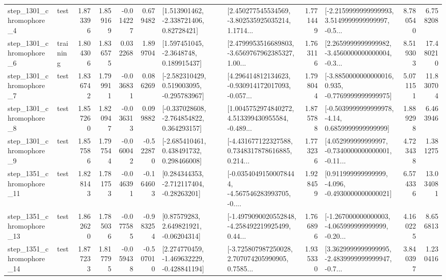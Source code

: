 \begin{tabular}{llrrrrllrlrr}
  step\_1301\_chromophore\_4 &      test &      1.873396 &    1.859169 &     -0.014227 &  0.679482 &     [1.513901462, -2.338721406, 0.82728421] &  [2.450277545534569, -3.802535925035214, 1.1714... &       1.771449 &  [-2.2159999999999993, 3.5149999999999997, -0.5... &            8.780540 &          6.758208 \\
  step\_1301\_chromophore\_6 &  training &      1.804306 &    1.836575 &      0.032268 &  1.899704 &      [1.597451045, -2.3648748, 0.189915437] &  [2.4799953516689803, -3.6569767962385327, 1.00... &       1.763116 &  [2.2659999999999982, -3.4560000000000004, -0.3... &            8.519303 &         17.480210 \\
  step\_1301\_chromophore\_7 &      test &      1.836742 &    1.799911 &     -0.036831 &  0.086269 &   [-2.582310429, 0.519003095, -0.295783967] &  [4.296414812134623, -0.930914172017093, -0.057... &       1.798044 &  [-3.8850000000000016, 0.935, -0.7769999999999975] &            5.071151 &         11.830704 \\
  step\_1301\_chromophore\_8 &      test &      1.857260 &    1.820947 &     -0.036313 &  0.099882 &   [-0.337028608, -2.764854822, 0.364293157] &  [1.0045752974840272, 4.513399430955584, -0.489... &       1.875788 &   [-0.5039999999999978, -4.14, 0.6859999999999999] &            1.889298 &          6.463946 \\
  step\_1301\_chromophore\_9 &      test &      1.857586 &    1.797544 &     -0.060042 & -0.522870 &    [-2.685410461, 0.438491732, 0.298466008] &  [-4.431677122327588, 0.7348317878616885, 0.214... &       1.773236 &  [4.052999999999997, -0.7340000000000001, -0.11... &            4.723438 &          1.381275 \\
 step\_1351\_chromophore\_11 &      test &      1.828143 &    1.781753 &     -0.046391 & -0.164603 &    [0.284344353, -2.712117404, -0.28263201] &  [-0.03540491500078444, -4.567546283993705, -0.... &       1.928459 &   [0.911999999999999, -4.096, -0.4930000000000021] &            6.574336 &         13.034081 \\
 step\_1351\_chromophore\_13 &      test &      1.862620 &    1.785036 &     -0.077585 & -0.983254 &      [0.87579283, 2.649821921, -0.06204314] &  [-1.4979090020552848, -4.258492219925499, 0.44... &       1.766896 &  [-1.267000000000003, -4.065999999999999, -0.20... &            4.160225 &          8.656813 \\
 step\_1351\_chromophore\_14 &      test &      1.877233 &    1.817795 &     -0.059438 & -0.507010 &   [2.274770459, -1.469632229, -0.428841194] &  [-3.725807987250028, 2.707074205990905, 0.7585... &       1.935330 &  [3.3629999999999995, -2.4839999999999947, -0.7... &            3.840397 &          1.230416 \\

\end{tabular}
